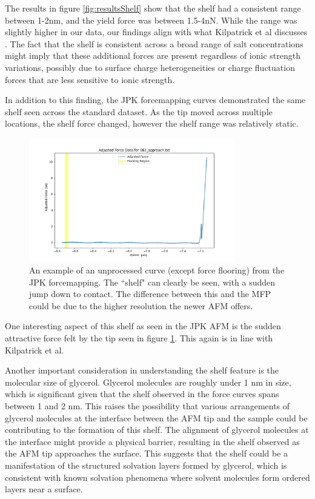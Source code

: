 The results in figure \ref{fig:resultsShelf} show that the shelf had a consistent range between 1-2nm, and the yield force was between 1.5-4nN. While the range was slightly higher in our data, our findings align with what Kilpatrick et al discusses \cite{Kilpatrick2013DirectlyProbing}. The fact that the shelf is consistent across a broad range of salt concentrations might imply that these additional forces are present regardless of ionic strength variations, possibly due to surface charge heterogeneities or charge fluctuation forces that are less sensitive to ionic strength.

In addition to this finding, the JPK forcemapping curves demonstrated the same shelf seen across the standard dataset. As the tip moved across multiple locations, the shelf force changed, however the shelf range was relatively static.

\begin{figure}[h!!]
\centering
\includegraphics[width=0.8\textwidth]{chapter8/Shelf/083_approach.png}
\caption{An example of an unprocessed curve (except force flooring) from the JPK forcemapping. The ``shelf" can clearly be seen, with a sudden jump down to contact. The difference between this and the MFP could be due to the higher resolution the newer AFM offers.}
\label{fig:noisey}
\end{figure}

One interesting aspect of this shelf as seen in the JPK AFM is the sudden attractive force felt by the tip seen in figure \ref{fig:noisey}. This again is in line with Kilpatrick et al. 

Another important consideration in understanding the shelf feature is the molecular size of glycerol. Glycerol molecules are roughly under 1 nm in size, which is significant given that the shelf observed in the force curves spans between 1 and 2 nm. This raises the possibility that various arrangements of glycerol molecules at the interface between the AFM tip and the sample could be contributing to the formation of this shelf. The alignment of glycerol molecules at the interface might provide a physical barrier, resulting in the shelf observed as the AFM tip approaches the surface. This suggests that the shelf could be a manifestation of the structured solvation layers formed by glycerol, which is consistent with known solvation phenomena where solvent molecules form ordered layers near a surface.

